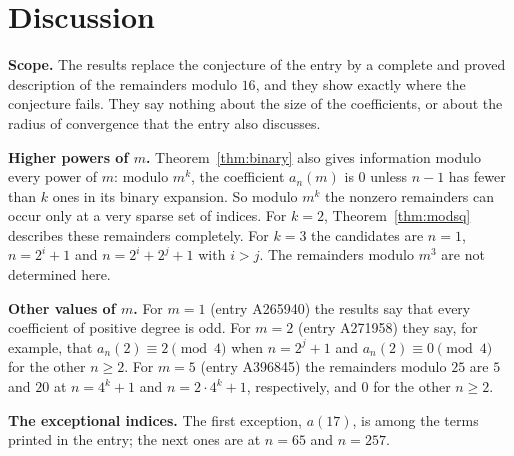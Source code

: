\documentclass[11pt,a4paper]{article}
\theoremstyle{definition}
\theoremstyle{remark}
\newcommand{\para}[1]{\par\medskip\noindent\textbf{#1}\enspace}
\begin{document}
\section{Discussion}\label{sec:discussion}

\para{Scope.} The results replace the conjecture of the entry by a complete and proved description of the remainders
modulo $16$, and they show exactly where the conjecture fails. They say nothing about the size of the coefficients, or
about the radius of convergence that the entry also discusses.

\para{Higher powers of $m$.} Theorem~\ref{thm:binary} also gives information modulo every power of $m$: modulo
$m^k$, the coefficient $a_n(m)$ is $0$ unless $n-1$ has fewer than $k$ ones in its binary expansion. So modulo $m^k$
the nonzero remainders can occur only at a very sparse set of indices. For $k=2$, Theorem~\ref{thm:modsq} describes these
remainders completely. For $k=3$ the candidates are $n=1$, $n=2^i+1$ and $n=2^i+2^j+1$ with $i>j$. The remainders modulo
$m^3$ are not determined here.

\para{Other values of $m$.} For $m=1$ (entry A265940) the results say that every coefficient of positive degree is odd. For $m=2$
(entry A271958) they say, for example, that $a_n(2)\equiv2\pmod 4$ when $n=2^j+1$ and $a_n(2)\equiv0\pmod4$ for the
other $n\ge2$. For $m=5$ (entry A396845) the remainders modulo $25$ are $5$ and $20$ at $n=4^k+1$ and $n=2\cdot4^k+1$,
respectively, and $0$ for the other $n\ge2$.

\para{The exceptional indices.} The first exception, $a(17)$, is among the terms printed in the entry; the next ones
are at $n=65$ and $n=257$.
\end{document}

